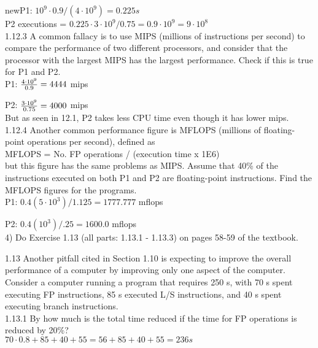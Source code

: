 newP1: $10^9 \cdot 0.9 / (4 \cdot 10^9) = 0.225s$ \\

P2 executions = $0.225 \cdot 3 \cdot 10^9 / 0.75 = 0.9 \cdot 10^9 = 9 \cdot 10^8$ \\

1.12.3 A common fallacy is to use MIPS (millions of instructions per second) to compare the performance of two different processors, and consider that the processor with the largest MIPS has the largest performance. Check if this is true for P1 and P2. \\

P1: $\frac{4 \cdot 10^9}{0.9} = 4444$ mips

P2: $\frac{3 \cdot 10^9}{0.75} = 4000$ mips\\

But as seen in 12.1, P2 takes less CPU time even though it has lower mips. \\

1.12.4 Another common performance figure is MFLOPS (millions of floating-point operations per second), defined as \\

MFLOPS = No. FP operations / (execution time x 1E6) \\

but this figure has the same problems as MIPS. Assume that 40\% of the instructions executed on both P1 and P2 are floating-point instructions. Find the MFLOPS figures for the programs. \\

P1: $0.4(5 \cdot 10^3)/1.125 =  1777.777$ mflops

P2: $0.4(10^3)/.25 = 1600.0$ mflops \\


4) Do Exercise 1.13 (all parts: 1.13.1 - 1.13.3) on pages 58-59 of the textbook.

1.13 Another pitfall cited in Section 1.10 is expecting to improve the overall performance of a computer by improving only one aspect of the computer. Consider a computer running a program that requires 250 s, with 70 s spent executing FP instructions, 85 s executed L/S instructions, and 40 s spent executing branch instructions. \\

1.13.1 By how much is the total time reduced if the time for FP
operations is reduced by 20\%? \\

$70 \cdot 0.8 + 85 + 40 + 55 = 56 + 85 + 40 + 55 = 236s$ \\

